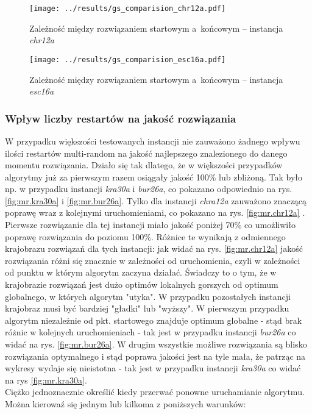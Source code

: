 \documentclass{article}
\begin{document}
			\begin{figure}[h]
				\texttt{[image: ../results/gs\_comparision\_chr12a.pdf]}
				\caption{Zależność między rozwiązaniem startowym a~końcowym -- instancja \emph{chr12a}\label{fig:gs.chr12a}}				
			\end{figure}
			
			\begin{figure}[h]
				\texttt{[image: ../results/gs\_comparision\_esc16a.pdf]}
				\caption{Zależność między rozwiązaniem startowym a~końcowym -- instancja \emph{esc16a}\label{fig:gs.esc16a}}				
			\end{figure}
		
		\subsubsection{Wpływ liczby restartów na jakość rozwiązania}		
			W przypadku większości testowanych instancji nie zauważono żadnego wpływu ilości restartów multi-random na jakość najlepszego znalezionego do danego momentu rozwiązania. Działo się tak dlatego, że w większości przypadków algorytmy już za pierwszym razem osiągały jakość  100\%  lub zbliżoną. Tak było np. w przypadku instancji \emph{kra30a} i \emph{bur26a}, co pokazano odpowiednio na rys. \ref{fig:mr.kra30a} i \ref{fig:mr.bur26a}. Tylko dla instancji \emph{chra12a} zauważono znaczącą poprawę wraz z kolejnymi uruchomieniami, co pokazano na rys. \ref{fig:mr.chr12a}  . Pierwsze rozwiązanie dla tej instancji miało jakość poniżej 70\% co umożliwiło poprawę rozwiązania do poziomu 100\%. Różnice te wynikają z odmiennego krajobrazu rozwiązań dla tych instancji: jak widać na rys. \ref{fig:mr.chr12a} jakość rozwiązania różni się znacznie w zależności od uruchomienia, czyli w zależności od punktu w którym algorytm zaczyna działać. Świadczy to o tym, że w krajobrazie rozwiązań jest dużo optimów lokalnych gorszych od optimum globalnego, w których algorytm "utyka". W przypadku pozostałych instancji krajobraz musi być bardziej "gładki" lub "wyższy". W pierwszym przypadku algorytm niezależnie od pkt. startowego znajduje optimum globalne  - stąd brak różnic w kolejnych uruchomieniach - tak jest w przypadku instancji \emph{bur26a} co widać na rys. \ref{fig:mr.bur26a}. W drugim wszystkie możliwe rozwiązania są blisko rozwiązania optymalnego i stąd poprawa jakości jest na tyle mała, że patrząc na wykresy wydaje się nieistotna - tak jest w przypadku instancji \emph{kra30a} co widać na rys \ref{fig:mr.kra30a}.
			\\Ciężko jednoznacznie określić kiedy przerwać ponowne uruchamianie algorytmu. Można kierowaź się jednym lub kilkoma z poniższych warunków:
\end{document}
